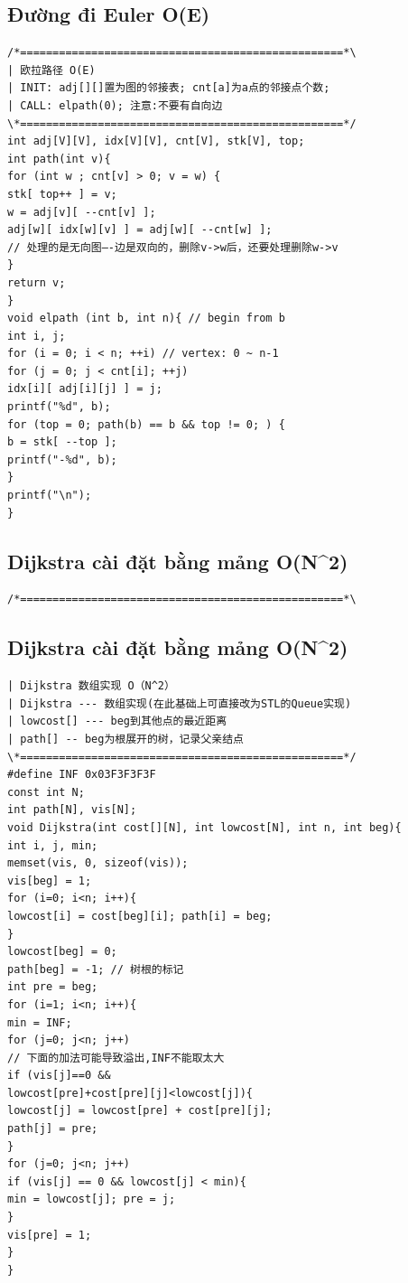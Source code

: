\documentclass[11pt]{article}
\begin{document}
\subsection{Đường đi Euler O(E)}

\begingroup
\scriptsize
\begin{verbatim}
/*==================================================*\
| 欧拉路径 O(E)
| INIT: adj[][]置为图的邻接表; cnt[a]为a点的邻接点个数;
| CALL: elpath(0); 注意:不要有自向边
\*==================================================*/
int adj[V][V], idx[V][V], cnt[V], stk[V], top;
int path(int v){
for (int w ; cnt[v] > 0; v = w) {
stk[ top++ ] = v;
w = adj[v][ --cnt[v] ];
adj[w][ idx[w][v] ] = adj[w][ --cnt[w] ];
// 处理的是无向图—-边是双向的，删除v->w后，还要处理删除w->v
}
return v;
}
void elpath (int b, int n){ // begin from b
int i, j;
for (i = 0; i < n; ++i) // vertex: 0 ~ n-1
for (j = 0; j < cnt[i]; ++j)
idx[i][ adj[i][j] ] = j;
printf("%d", b);
for (top = 0; path(b) == b && top != 0; ) {
b = stk[ --top ];
printf("-%d", b);
}
printf("\n");
}
\end{verbatim}
\endgroup

\subsection{Dijkstra cài đặt bằng mảng O(N\textasciicircum{}2)}

\begingroup
\scriptsize
\begin{verbatim}
/*==================================================*\
\end{verbatim}
\endgroup

\subsection{Dijkstra cài đặt bằng mảng O(N\textasciicircum{}2)}

\begingroup
\scriptsize
\begin{verbatim}
| Dijkstra 数组实现 O（N^2）
| Dijkstra --- 数组实现(在此基础上可直接改为STL的Queue实现)
| lowcost[] --- beg到其他点的最近距离
| path[] -- beg为根展开的树，记录父亲结点
\*==================================================*/
#define INF 0x03F3F3F3F
const int N;
int path[N], vis[N];
void Dijkstra(int cost[][N], int lowcost[N], int n, int beg){
int i, j, min;
memset(vis, 0, sizeof(vis));
vis[beg] = 1;
for (i=0; i<n; i++){
lowcost[i] = cost[beg][i]; path[i] = beg;
}
lowcost[beg] = 0;
path[beg] = -1; // 树根的标记
int pre = beg;
for (i=1; i<n; i++){
min = INF;
for (j=0; j<n; j++)
// 下面的加法可能导致溢出,INF不能取太大
if (vis[j]==0 &&
lowcost[pre]+cost[pre][j]<lowcost[j]){
lowcost[j] = lowcost[pre] + cost[pre][j];
path[j] = pre;
}
for (j=0; j<n; j++)
if (vis[j] == 0 && lowcost[j] < min){
min = lowcost[j]; pre = j;
}
vis[pre] = 1;
}
}
\end{verbatim}
\endgroup
\end{document}

